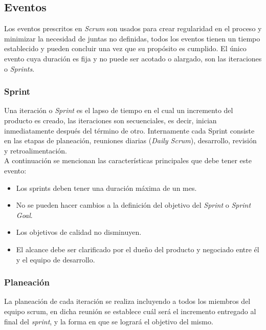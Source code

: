 \subsection{Eventos}

 Los eventos prescritos en {\it Scrum} son usados para crear regularidad en el proceso y minimizar
 la necesidad de juntas no definidas, todos los eventos tienen un tiempo establecido y pueden
 concluir una vez que su propósito es cumplido. El único evento cuya duración es fija y no puede
 ser acotado o alargado, son las iteraciones o {\it Sprints}.
 
\subsubsection{Sprint}

 Una iteración o {\it Sprint} es el lapso de tiempo en el cual un incremento del producto es 
 creado, las iteraciones son secuenciales, es decir, inician inmediatamente después del término
 de otro. Internamente cada Sprint consiste en las etapas de planeación, reuniones diarias
 ({\it Daily Scrum}), desarrollo, revisión y retroalimentación.\\

 \noindent A continuación se mencionan las características principales que debe tener este evento:

    \begin{itemize}
    \item Los sprints deben tener una duración máxima de un mes.
    \item No se pueden hacer cambios a la definición del objetivo del {\it Sprint}
          o {\it Sprint Goal}.
    \item Los objetivos de calidad no disminuyen.
    \item El alcance debe ser clarificado por el dueño del producto y negociado entre 
          él y el equipo de desarrollo.
    \end{itemize}


\subsubsection{Planeación}

 La planeación de cada iteración se realiza incluyendo a todos los miembros del equipo scrum,
 en dicha reunión se establece cuál será el incremento entregado al final del {\it sprint}, y la
 forma en que se logrará el objetivo del mismo.\\

